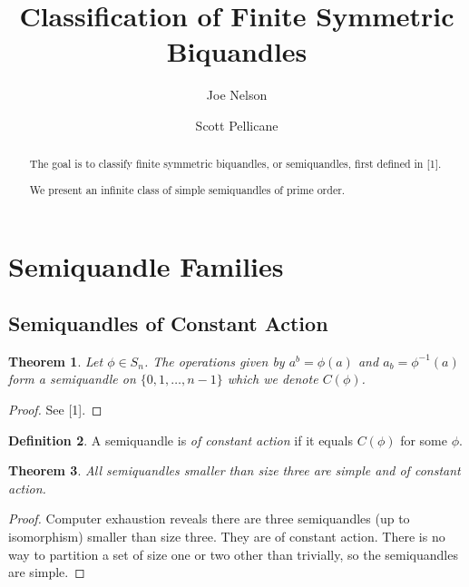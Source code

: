 \documentclass{amsart}
\newtheorem{thm}{Theorem}[section]
\theoremstyle{definition}
\newtheorem{definition}[thm]{Definition}
\numberwithin{equation}{section}
\begin{document}
\title{Classification of Finite Symmetric Biquandles}

\author{Joe Nelson}
\author{Scott Pellicane}

\begin{abstract}
The goal is to classify finite symmetric biquandles, or semiquandles, first defined in [1].

We present an infinite class of simple semiquandles of prime order.
\end{abstract}

\maketitle



\section{Semiquandle Families}

\subsection{Semiquandles of Constant Action}

\begin{thm}
Let $\phi \in S_n$. The operations given by $a^{b} = \phi(a)$ and $a_b = \phi^{-1}(a)$ form
a semiquandle on $\{0, 1, \ldots, n-1\}$ which we denote $C(\phi)$.
\end{thm}
\begin{proof}
See [1].
\end{proof}

\begin{definition}
A semiquandle is \emph{of constant action} if it equals $C(\phi)$ for some $\phi$.
\end{definition}

\begin{thm}
All semiquandles smaller than size three are simple and of constant action.
\end{thm}
\begin{proof}
Computer exhaustion reveals there are three semiquandles (up to isomorphism) smaller than
size three. They are of constant action. There is no way to partition a set of size one or two
other than trivially, so the semiquandles are simple.
\end{proof}
\end{document}
